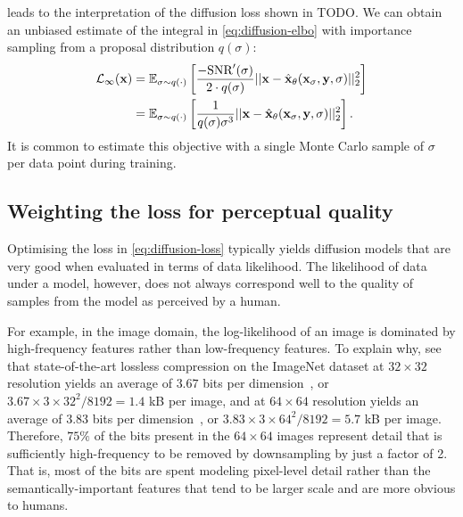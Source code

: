  leads to the interpretation of the diffusion loss shown in TODO. We can obtain an unbiased estimate of the integral in \cref{eq:diffusion-elbo} with importance sampling from a proposal distribution $q(\sigma)$: 
\begin{align}
    \mathcal{L}_\infty({\mathbf{x}}) &= \mathbb{E}_{\sigma \sim q(\cdot)} \left[ \frac{-\text{SNR}'(\sigma)}{2 \cdot q(\sigma)} || {\mathbf{x}} - \hat{{\mathbf{x}}}_\theta({\mathbf{x}}_\sigma, {\mathbf{y}}, \sigma) ||_2^2 \right]  \\
    &= \mathbb{E}_{\sigma \sim q(\cdot)} \left[ \frac{1}{q(\sigma)\sigma^3} || {\mathbf{x}} - \hat{{\mathbf{x}}}_\theta({\mathbf{x}}_\sigma, {\mathbf{y}}, \sigma) ||_2^2 \right]. \label{eq:diffusion-loss}
\end{align}
It is common to estimate this objective with a single Monte Carlo sample of $\sigma$ per data point during training.

\subsection{Weighting the loss for perceptual quality} \label{sec:diffusion-perceptual-quality}
Optimising the loss in \cref{eq:diffusion-loss} typically yields diffusion models that are very good when evaluated in terms of data likelihood. The likelihood of data under a model, however, does not always correspond well to the quality of samples from the model as perceived by a human.

For example, in the image domain, the log-likelihood of an image is dominated by high-frequency features rather than low-frequency features. To explain why, see that state-of-the-art lossless compression on the ImageNet dataset at $32\times32$ resolution yields an average of $3.67$ bits per dimension~\citep{sahoo2023diffusion}, or $3.67\times3\times32^2 / 8192 = 1.4$ kB per image, and at $64\times64$ resolution yields an average of 3.83 bits per dimension~\citep{finlay2020train}, or $3.83\times3\times64^2 / 8192 = 5.7$ kB per image. Therefore, $75\%$ of the bits present in the $64\times64$ images represent detail that is sufficiently high-frequency to be removed by downsampling by just a factor of 2. That is, most of the bits are spent modeling pixel-level detail rather than the semantically-important features that tend to be larger scale and are more obvious to humans.

